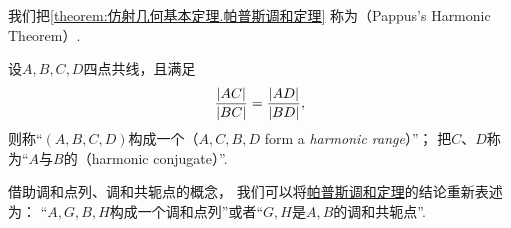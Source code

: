 我们把\cref{theorem:仿射几何基本定理.帕普斯调和定理}
称为（Pappus's Harmonic Theorem）.

\begin{definition}
设\(A,B,C,D\)四点共线，且满足\begin{equation*}
	\frac{\abs{AC}}{\abs{BC}}
	= \frac{\abs{AD}}{\abs{BD}},
\end{equation*}
则称“\((A,B,C,D)\)构成一个（\(A,C,B,D\) form a \emph{harmonic range}）”；
把\(C\)、\(D\)称为“\(A\)与\(B\)的（harmonic conjugate）”.
\end{definition}

借助调和点列、调和共轭点的概念，
我们可以将\hyperref[theorem:仿射几何基本定理.帕普斯调和定理]{帕普斯调和定理}的结论重新表述为：
“\(A,G,\allowbreak B,H\)构成一个调和点列”或者“\(G,H\)是\(A,B\)的调和共轭点”.
